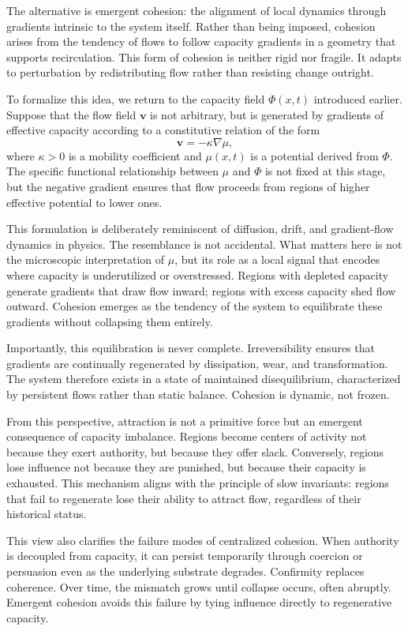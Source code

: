 \documentclass[12pt,oneside]{book}
\begin{document}
The alternative is emergent cohesion: the alignment of local dynamics through gradients intrinsic to the system itself. Rather than being imposed, cohesion arises from the tendency of flows to follow capacity gradients in a geometry that supports recirculation. This form of cohesion is neither rigid nor fragile. It adapts to perturbation by redistributing flow rather than resisting change outright.

To formalize this idea, we return to the capacity field \(\Phi(x,t)\) introduced earlier. Suppose that the flow field \(\mathbf{v}\) is not arbitrary, but is generated by gradients of effective capacity according to a constitutive relation of the form
\[
\mathbf{v} = -\kappa \nabla \mu,
\]
where \(\kappa > 0\) is a mobility coefficient and \(\mu(x,t)\) is a potential derived from \(\Phi\). The specific functional relationship between \(\mu\) and \(\Phi\) is not fixed at this stage, but the negative gradient ensures that flow proceeds from regions of higher effective potential to lower ones.

This formulation is deliberately reminiscent of diffusion, drift, and gradient-flow dynamics in physics. The resemblance is not accidental. What matters here is not the microscopic interpretation of \(\mu\), but its role as a local signal that encodes where capacity is underutilized or overstressed. Regions with depleted capacity generate gradients that draw flow inward; regions with excess capacity shed flow outward. Cohesion emerges as the tendency of the system to equilibrate these gradients without collapsing them entirely.

Importantly, this equilibration is never complete. Irreversibility ensures that gradients are continually regenerated by dissipation, wear, and transformation. The system therefore exists in a state of maintained disequilibrium, characterized by persistent flows rather than static balance. Cohesion is dynamic, not frozen.

From this perspective, attraction is not a primitive force but an emergent consequence of capacity imbalance. Regions become centers of activity not because they exert authority, but because they offer slack. Conversely, regions lose influence not because they are punished, but because their capacity is exhausted. This mechanism aligns with the principle of slow invariants: regions that fail to regenerate lose their ability to attract flow, regardless of their historical status.

This view also clarifies the failure modes of centralized cohesion. When authority is decoupled from capacity, it can persist temporarily through coercion or persuasion even as the underlying substrate degrades. Confirmity replaces coherence. Over time, the mismatch grows until collapse occurs, often abruptly. Emergent cohesion avoids this failure by tying influence directly to regenerative capacity.
\end{document}
